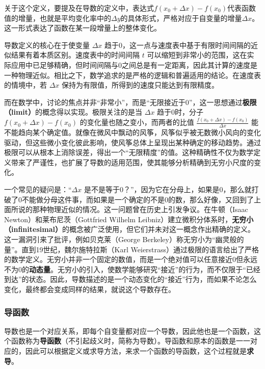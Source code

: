 关于这个定义，要提及在导数的定义中，表达式$f(x_0+\Delta x)-f(x_0)$代表函数值的增量，也就是平均变化率中的$\Delta y$的具体形式，严格对应于自变量的增量$\Delta x$。这一形式表达了函数在某一段增量上的整体变化。

导数定义的核心在于使变量 $\Delta x$ 趋于0，这一点与速度表中基于有限时间间隔的近似结果有着本质区别。速度表中的时间间隔 $t$ 可以缩短到非常小的范围，这在实际应用中已足够精确，但时间间隔与0之间总是有一定距离，因此其计算的速度是一种物理近似。相比之下，数学追求的是严格的逻辑和普遍适用的结论。在速度表的情境中，若 $\Delta x$ 保持为有限值，所得到的速度只能达到有限精度。

而在数学中，讨论的焦点并非“非常小”，而是“无限接近于0”，这一思想通过\textbf{极限（limit）}的概念得以实现。极限关注的是当 $\Delta x$ 趋于0时，分子 $f(x_0 + \Delta x) - f(x_0)$ 的变化量也随之变小，而两者的比值 $\frac{f(x_0 + \Delta x) - f(x_0)}{\Delta x}$ 能不能趋向某个确定值。就像在微风中飘动的风筝，风筝似乎被无数微小风向的变化驱动，但这些微小变化彼此影响，使风筝总体上呈现出某种确定的移动趋势。通过极限可以从根本上消除误差，得出一个“无限精度”的值。这种精确性不仅为数学定义带来了严谨性，也扩展了导数的适用范围，使其能够分析精确到无穷小尺度的变化。

一个常见的疑问是：“$\Delta x$ 是不是等于0？”，因为它在分母上，如果是0，那么就打破了0不能做分母这件事，而如果是一个确定的不是0的数，那么好像，又回到了上面所说的那种物理近似的情况。这一问题曾在历史上引发争议。在牛顿（Isaac Newton）和莱布尼茨（Gottfried Wilhelm Leibniz）建立微积分体系时，\textbf{无穷小（infinitesimal）}的概念被广泛使用，但它们并未对这一概念作出精确的定义。这一漏洞引来了批评，例如贝克莱（George Berkeley）称无穷小为“幽灵般的量”。直到19世纪，魏尔施特拉斯（Karl Weierstrass）通过极限的语言给出了严格的数学定义。无穷小并非一个固定的数值，而是一个绝对值可以任意接近0但永远不为0的\textbf{动态量}。无穷小的引入，使数学能够研究“接近”的行为，而不仅限于“已经到达”的状态。因此，导数描述的是一个动态变化的“接近”行为，而如果不论怎么变化，最终都会变成同样的结果，就说这个导数存在。

\subsubsection{导函数}

导数也是一个对应关系，即每个自变量都对应一个导数，因此他也是一个函数，这个函数称为\textbf{导函数}（不引起歧义时，简称为导数）。导函数和原本的函数是一一对应的，因此可以根据定义或求导方法，来求一个函数的导函数，这个过程就是\textbf{求导}。

